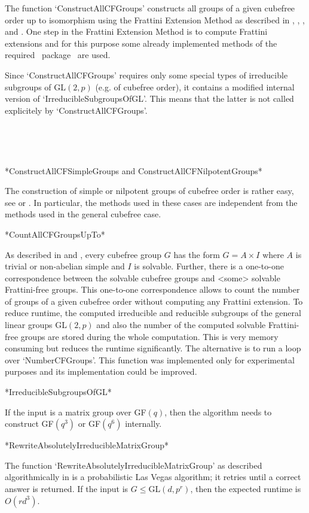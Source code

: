 The function `ConstructAllCFGroups' constructs all groups of a given
cubefree order up to isomorphism using the Frattini Extension Method as described in \cite{Di05},
  \cite{DiEi05}, \cite{BeEia}, and \cite{BeEib}. One step in the Frattini
  Extension Method is to compute Frattini extensions 
  and for this purpose some already implemented
methods of the required \GAP ~package \GrpConst ~are used. 

Since `ConstructAllCFGroups' requires only
some special types of irreducible subgroups of GL$(2,p)$ (e.g. of cubefree order), it
contains a modified internal version of
`IrreducibleSubgroupsOfGL'. This means that the latter is not called explicitely by
`ConstructAllCFGroups'.

~

~

*ConstructAllCFSimpleGroups and ConstructAllCFNilpotentGroups*

The construction of simple or nilpotent groups of cubefree
order is rather easy, see \cite{Di05} or \cite{DiEi05}. In particular, the
methods used in these cases are independent from the methods used in the general cubefree case.


*CountAllCFGroupsUpTo*

As described in \cite{Di05} and \cite{DiEi05}, every cubefree group $G$ has
the form $G=A\times I$ where $A$ is trivial or non-abelian simple and $I$ is
solvable. Further, there is a one-to-one correspondence between the solvable
cubefree groups and <some> solvable Frattini-free groups. This one-to-one
correspondence allows to count the number of groups of a given cubefree order without
computing any Frattini extension.
To reduce runtime, the
computed irreducible and reducible subgroups of the general linear groups
GL$(2,p)$ and also the number of the computed solvable
Frattini-free groups are stored during the whole computation. This is very
memory consuming but reduces the runtime significantly. The alternative is to
run a loop over `NumberCFGroups'.
This function was implemented only for experimental purposes and its
implementation could be improved.

*IrreducibleSubgroupsOfGL*

If the input is a matrix group over GF$(q)$, then the algorithm needs to
construct GF$(q^3)$ or GF$(q^6)$ internally. 



*RewriteAbsolutelyIrreducibleMatrixGroup*

The function `RewriteAbsolutelyIrreducibleMatrixGroup' as described
algorithmically in
\cite{GlHo97} is a probabilistic Las Vegas algorithm; it retries until a correct
answer is returned. If the input is $G\leq$GL$(d,p^r)$, then the
expected runtime is $O(rd^3)$.



